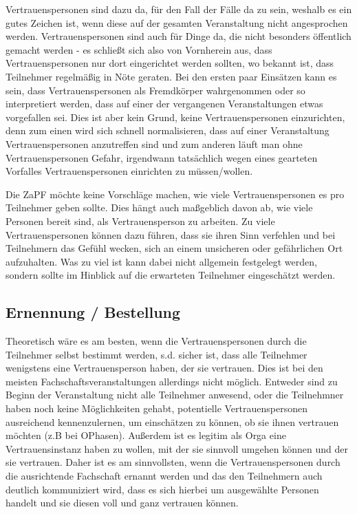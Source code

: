 \documentclass[DIV=calc]{scrartcl}
\begin{document}
Vertrauenspersonen sind dazu da, für den Fall der Fälle da zu sein, weshalb es ein gutes Zeichen ist, wenn diese auf der gesamten Veranstaltung nicht angesprochen werden. Vertrauenspersonen sind auch für Dinge da, die nicht besonders öffentlich gemacht werden - es schließt sich also von Vornherein aus, dass Vertrauenspersonen nur dort eingerichtet werden sollten, wo bekannt ist, dass Teilnehmer regelmäßig in Nöte geraten.
Bei den ersten paar Einsätzen kann es sein, dass Vertrauenspersonen als Fremdkörper wahrgenommen oder so interpretiert werden, dass auf einer der vergangenen Veranstaltungen etwas vorgefallen sei. Dies ist aber kein Grund, keine Vertrauenspersonen einzurichten, denn zum einen wird sich schnell normalisieren, dass auf einer Veranstaltung Vertrauenspersonen anzutreffen sind und zum anderen läuft man ohne Vertrauenspersonen Gefahr, irgendwann tatsächlich wegen eines  gearteten Vorfalles Vertrauenspersonen einrichten zu müssen/wollen.

Die ZaPF möchte keine Vorschläge machen, wie viele Vertrauenspersonen es pro Teilnehmer geben sollte. Dies hängt auch maßgeblich davon ab, wie viele Personen bereit sind, als Vertrauensperson zu arbeiten. Zu viele Vertrauenspersonen können dazu führen, dass sie ihren Sinn verfehlen und bei Teilnehmern das Gefühl wecken, sich an einem unsicheren oder gefährlichen Ort aufzuhalten. Was zu viel ist kann dabei nicht allgemein festgelegt werden, sondern sollte im Hinblick auf die erwarteten Teilnehmer eingeschätzt werden.

\subsection{Ernennung / Bestellung}

Theoretisch wäre es am besten, wenn die Vertrauenspersonen durch die Teilnehmer selbst bestimmt werden, s.d. sicher ist, dass alle Teilnehmer wenigstens eine Vertrauensperson haben, der sie vertrauen.
Dies ist bei den meisten Fachschaftsveranstaltungen allerdings nicht möglich. Entweder sind zu Beginn der Veranstaltung nicht alle Teilnehmer anwesend, oder die Teilnehmner haben noch keine Möglichkeiten gehabt, potentielle Vertrauenspersonen ausreichend kennenzulernen, um einschätzen zu können, ob sie ihnen vertrauen möchten (z.B bei OPhasen). Außerdem ist es legitim als Orga eine Vertrauensinstanz haben zu wollen, mit der sie sinnvoll umgehen können und der sie vertrauen. Daher ist es am sinnvollsten, wenn die Vertrauenspersonen durch die ausrichtende Fachschaft ernannt werden und das den Teilnehmern auch deutlich kommuniziert wird, dass es sich hierbei um ausgewählte Personen handelt und sie diesen voll und ganz vertrauen können.
\end{document}

